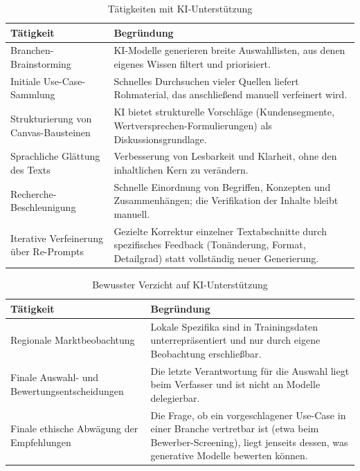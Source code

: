 \documentclass[a4paper,11pt]{article}
\begin{document}
\begin{table}[H]
\centering
\caption{Tätigkeiten mit KI-Unterstützung}
\label{tab:strategie_ki}
\begin{tabular}{p{6cm}p{9cm}}
\toprule
\textbf{Tätigkeit} & \textbf{Begründung} \\
\midrule
Branchen-Brainstorming & KI-Modelle generieren breite Auswahllisten, aus denen eigenes Wissen filtert und priorisiert. \\
Initiale Use-Case-Sammlung & Schnelles Durchsuchen vieler Quellen liefert Rohmaterial, das anschließend manuell verfeinert wird. \\
Strukturierung von Canvas-Bausteinen & KI bietet strukturelle Vorschläge (Kundensegmente, Wertversprechen-Formulierungen) als Diskussionsgrundlage. \\
Sprachliche Glättung des Texts & Verbesserung von Lesbarkeit und Klarheit, ohne den inhaltlichen Kern zu verändern. \\
Recherche-Beschleunigung & Schnelle Einordnung von Begriffen, Konzepten und Zusammenhängen; die Verifikation der Inhalte bleibt manuell. \\
Iterative Verfeinerung über Re-Prompts & Gezielte Korrektur einzelner Textabschnitte durch spezifisches Feedback (Tonänderung, Format, Detailgrad) statt vollständig neuer Generierung. \\
\bottomrule
\end{tabular}
\end{table}

\begin{table}[H]
\centering
\caption{Bewusster Verzicht auf KI-Unterstützung}
\label{tab:strategie_ohneki}
\begin{tabular}{p{6cm}p{9cm}}
\toprule
\textbf{Tätigkeit} & \textbf{Begründung} \\
\midrule
Regionale Marktbeobachtung & Lokale Spezifika sind in Trainingsdaten unterrepräsentiert und nur durch eigene Beobachtung erschließbar. \\
Finale Auswahl- und Bewertungsentscheidungen & Die letzte Verantwortung für die Auswahl liegt beim Verfasser und ist nicht an Modelle delegierbar. \\
Finale ethische Abwägung der Empfehlungen & Die Frage, ob ein vorgeschlagener Use-Case in einer Branche vertretbar ist (etwa beim Bewerber-Screening), liegt jenseits dessen, was generative Modelle bewerten können. \\
\bottomrule
\end{tabular}
\end{table}
\end{document}
